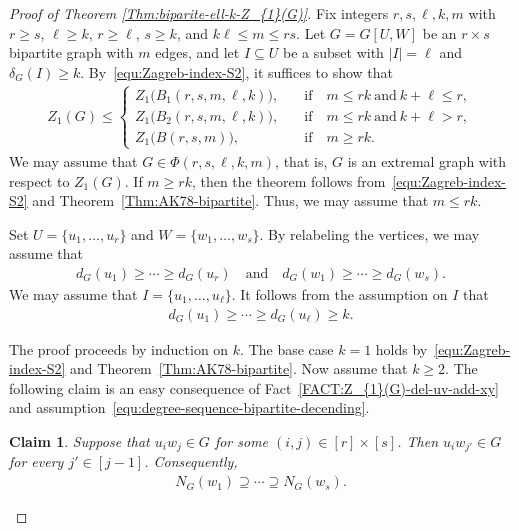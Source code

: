 \documentclass[11pt,a4paper]{article}
\newtheorem{claim}[definition]{Claim}
\begin{document}
\begin{proof}[Proof of Theorem \ref{Thm:biparite-ell-k-Z_{1}(G)}]
    Fix integers $r, s, \ell, k, m$ with $r \ge s$, $\ell \ge k$, $r \ge \ell$, $s \ge k$, and $k \ell \le m \le rs$.   
    Let $G = G[U, W]$ be an $r \times s$ bipartite graph with $m$ edges, and let $I \subseteq U$ be a subset with $|I| = \ell$ and $\delta_{G}(I) \ge k$. 
    By~\eqref{equ:Zagreb-index-S2}, it suffices to show that 
    \begin{align*}
        Z_{1}(G)
        \le 
        \begin{cases}
            Z_{1}\big(B_1(r,s,m,\ell,k) \big), &\quad\text{if}\quad m \le rk ~\text{and}~ k + \ell \le r, \\[0.5em]
            Z_{1}\big(B_2(r,s,m,\ell,k) \big), &\quad\text{if}\quad m \le rk ~\text{and}~ k + \ell > r, \\[0.5em]
            Z_{1}\big(B(r,s,m) \big), &\quad\text{if}\quad m \ge r k. 
        \end{cases}
    \end{align*}
    We may assume that $G \in \Phi(r,s,\ell, k,m)$, that is, $G$ is an extremal graph with respect to $Z_{1}(G)$. 
    If $m \ge r k$, then the theorem follows from~\eqref{equ:Zagreb-index-S2} and Theorem~\ref{Thm:AK78-bipartite}. 
    Thus, we may assume that $m \le rk$. 

    Set $U = \{u_1, \ldots, u_{r}\}$ and $W = \{w_1, \ldots, w_{s}\}$. 
    By relabeling the vertices, we may assume that 
    \begin{align}\label{equ:degree-sequence-bipartite-decending}
        d_{G}(u_1) \ge \cdots \ge d_{G}(u_{r})
        \quad\text{and}\quad 
        d_{G}(w_1) \ge \cdots \ge d_{G}(w_{s}). 
    \end{align}
    We may assume that $I = \{u_1, \ldots, u_{\ell}\}$. 
    It follows from the assumption on $I$ that 
    \begin{align}\label{equ:degree-sequence-I-bipartite}
        d_{G}(u_1) \ge \cdots \ge d_{G}(u_{\ell}) \ge k. 
    \end{align}

    The proof proceeds by induction on $k$. 
    The base case $k=1$ holds by~\eqref{equ:Zagreb-index-S2} and Theorem~\ref{Thm:AK78-bipartite}. 
    Now assume that $k \ge 2$. 
    The following claim is an easy consequence of Fact~\ref{FACT:Z_{1}(G)-del-uv-add-xy} and assumption~\eqref{equ:degree-sequence-bipartite-decending}. 

    \begin{claim}\label{Claim:complete-bipartite-graph-bi}
        Suppose that $u_iw_j \in G$ for some $(i,j) \in [r] \times [s]$. Then $u_{i}w_{j'} \in G$ for every $j' \in [j-1]$. 
        Consequently, 
        \begin{align}\label{equ:Nws-subseteq}
            N_{G}(w_1) \supseteq \cdots \supseteq N_{G}(w_{s}).  
        \end{align} 
    \end{claim}


\end{proof}
\end{document}
